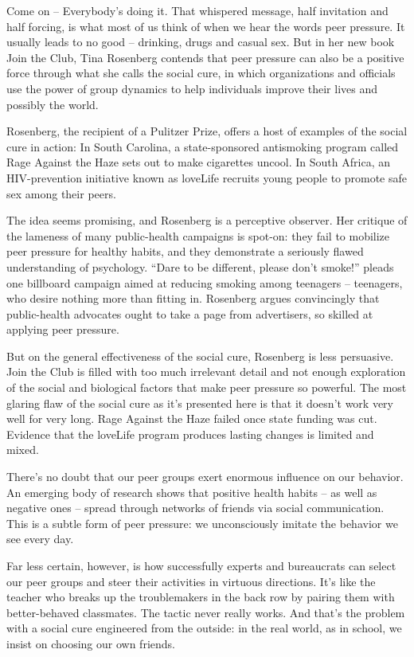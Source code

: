 Come on – Everybody's doing it. That whispered message, half invitation and half forcing, is what most of us think of when we hear the words peer pressure. It usually leads to no good – drinking, drugs and casual sex. But in her new book Join the Club, Tina Rosenberg contends that peer pressure can also be a positive force through what she calls the social cure, in which organizations and officials use the power of group dynamics to help individuals improve their lives and possibly the world.


Rosenberg, the recipient of a Pulitzer Prize, offers a host of examples of the social cure in action: In South Carolina, a state-sponsored antismoking program called Rage Against the Haze sets out to make cigarettes uncool. In South Africa, an HIV-prevention initiative known as loveLife recruits young people to promote safe sex among their peers.


The idea seems promising, and Rosenberg is a perceptive observer. Her critique of the lameness of many public-health campaigns is spot-on: they fail to mobilize peer pressure for healthy habits, and they demonstrate a seriously flawed understanding of psychology. ``Dare to be different, please don't smoke!'' pleads one billboard campaign aimed at reducing smoking among teenagers – teenagers, who desire nothing more than fitting in. Rosenberg argues convincingly that public-health advocates ought to take a page from advertisers, so skilled at applying peer pressure.


But on the general effectiveness of the social cure, Rosenberg is less persuasive. Join the Club is filled with too much irrelevant detail and not enough exploration of the social and biological factors that make peer pressure so powerful. The most glaring flaw of the social cure as it's presented here is that it doesn't work very well for very long. Rage Against the Haze failed once state funding was cut. Evidence that the loveLife program produces lasting changes is limited and mixed.


There's no doubt that our peer groups exert enormous influence on our behavior. An emerging body of research shows that positive health habits – as well as negative ones – spread through networks of friends via social communication. This is a subtle form of peer pressure: we unconsciously imitate the behavior we see every day.


Far less certain, however, is how successfully experts and bureaucrats can select our peer groups and steer their activities in virtuous directions. It's like the teacher who breaks up the troublemakers in the back row by pairing them with better-behaved classmates. The tactic never really works. And that's the problem with a social cure engineered from the outside: in the real world, as in school, we insist on choosing our own friends.